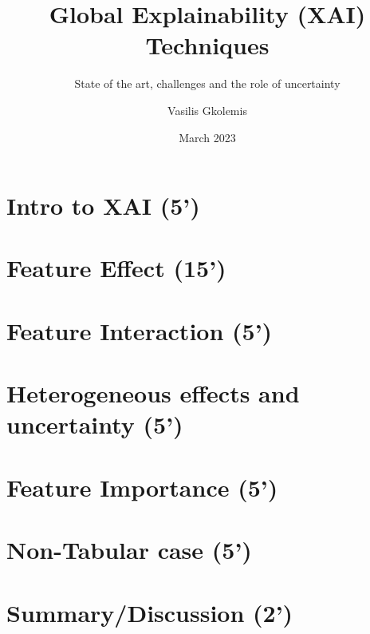 \documentclass{beamer}
\title[FUB-Presentation]{Global Explainability (XAI) Techniques}
\subtitle{State of the art, challenges and the role of uncertainty}
\author[Gkolemis, Vasilis] %
{Vasilis Gkolemis\inst{!}\inst{*}}
\institute[HUA] %
{
  \inst{!} ATHENA Research and Innovation Center \and
  \inst{*} Harokopio University of Athens
}
\date{March 2023}
\begin{document}
\frame{\titlepage}

\section[Intro to XAI]{Intro to XAI (5')}


\section[Feature Effect]{Feature Effect (15')}


\section[Feature Interaction]{Feature Interaction (5')}


\section[Heterogeneous effects]{Heterogeneous effects and uncertainty (5')}


\section[Feature Importance]{Feature Importance (5')}


\section[Non-Tabular case]{Non-Tabular case (5')}


\section[Summary]{Summary/Discussion (2')}

\end{document}
